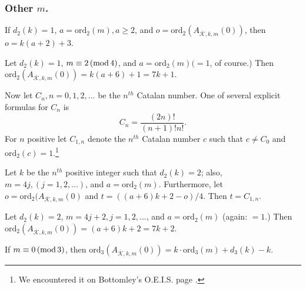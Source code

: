 \documentclass{article}
\begin{document}
\subsubsection[]{Other $m$.}
\begin{conjecture}
If $d_2(k) = 1$, 
$a = \text{ord}_2(m), 
a \geq 2$, and
$o = \text{ord}_2 (A_{\overline{\mathcal{K}},k,m}(0))$,
then $o=k(a+2)+3$.
\end{conjecture}
\begin{conjecture} 
Let $d_2(k) = 1$,
$m \equiv 2 \thinspace 
(\text{mod} \thinspace 4)$,
and $a=\text{ord}_2(m) ( = 1$,
of course.)
Then 
$\text{ord}_2 (A_{\overline{\mathcal{K}},k,m}(0)) =
k(a+6) + 1 = 7k + 1$.
\end{conjecture} \noindent
Now let $C_n, n = 0, 1, 2, ...$ be 
the $n^{th}$ Catalan number. 
One of several explicit formulas 
for $C_n$ is $$C_n = 
\frac{(2n)!}{(n+1)!n!}.$$ \noindent
For $n$ positive
let  $C_{1,n}$ denote the $n^{th}$ 
Catalan number $c$ such that $c \neq C_0$ and $\text{ord}_2(c) = 1$.\footnote{We 
 encountered 
 it on Bottomley's O.E.I.S. page 
\cite{OEISbottomley}.}
\begin{conjecture}
Let 
$k$ be the $n^{th}$ positive integer
such that
$d_2(k) = 2$; also,
$m = 4j, (j = 1, 2,...)$,
and
$a = \text{ord}_2(m)$.
Furthermore, let
$o = \text{ord}_2 (A_{\overline{\mathcal{K}},k,m}(0)$ and 
$ t = ((a+6)k +2 - o)/4$.
Then 
$t = C_{1,n}$.
\end{conjecture}
\begin{conjecture}
Let  $d_2(k) = 2$,
$m = 4j + 2, j = 1, 2, ...$, and 
$a = \text{ord}_2(m)$ (again: $ = 1$.)
Then
$\text{ord}_2 
(A_{\overline{\mathcal{K}},k,m}(0)) = (a+6)k+2
= 7k + 2$.
\end{conjecture}
\begin{conjecture} If
$m \equiv 0 \thinspace 
(\text{mod} \thinspace 3)$,
then $\text{ord}_3 (A_{\overline{\mathcal{K}},k,m}(0))=
k \cdot \text{ord}_3(m) + d_3(k) - k.$
\end{conjecture}
\end{document}
